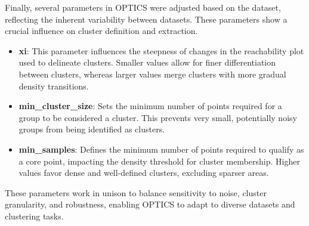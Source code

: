 Finally, several parameters in OPTICS were adjusted based on the dataset, reflecting the inherent variability between
datasets. These parameters show a crucial influence on cluster definition and extraction.
\begin{itemize}
    \item \textbf{xi}: This parameter influences the steepness of changes in the reachability plot used to
    delineate clusters. Smaller values allow for finer differentiation between clusters, whereas larger values merge
     clusters with more gradual density transitions.
    \item \textbf{min\_cluster\_size}: Sets the minimum number of points required for a group to be considered
     a cluster. This prevents very small, potentially noisy groups from being identified as clusters.
    \item \textbf{min\_samples}: Defines the minimum number of points required to qualify as a core point,
    impacting the density threshold for cluster membership. Higher values favor dense and well-defined clusters,
    excluding sparser areas.
\end{itemize}

These parameters work in unison to balance sensitivity to noise, cluster granularity, and robustness, enabling OPTICS
to adapt to diverse datasets and clustering tasks.
